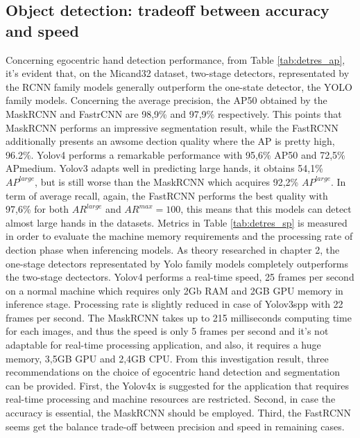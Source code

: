 \subsection{Object detection: tradeoff between accuracy and speed}
Concerning egocentric hand detection performance, from Table \ref{tab:detres_ap}, it’s evident that, on the Micand32 dataset, two-stage detectors, representated by the RCNN family models generally outperform the one-state detector, the YOLO family models. Concerning the average precision, the AP50 obtained by the MaskRCNN and FastrCNN are 98,9\% and 97,9\% respectively. This points that MaskRCNN performs an impressive segmentation result, while the FastRCNN additionally presents an awsome dection quality where the AP is pretty high, 96.2\%. Yolov4 performs a remarkable performance with 95,6\% AP50 and 72,5\% APmedium. Yolov3 adapts well in predicting large hands, it obtains 54,1\% \(AP^{large}\), but is still worse than the MaskRCNN which acquires 92,2\% \(AP^{large}\). In term of average recall, again, the FastRCNN performs the best quality with 97,6\% for both \(AR^{large}\) and \(AR^{max}=100\), this means that this models can detect almost large hands in the datasets.
Metrics in Table \ref{tab:detres_sp} is measured in order to evaluate the machine memory requirements and the processing rate of dection phase when inferencing models. As theory researched in chapter 2, the one-stage detectors representated by Yolo family models completely outperforms the two-stage dectectors. Yolov4 performs a real-time speed, 25 frames per second on a normal machine which requires only 2Gb RAM and 2GB GPU memory in inference stage. Processing rate is slightly reduced in case of Yolov3spp with 22 frames per second. The MaskRCNN takes up to 215 milliseconds computing time for each images, and thus the speed is only 5 frames per second and it’s not adaptable for real-time processing application, and also, it requires a huge memory, 3,5GB GPU and 2,4GB CPU.
From this investigation result, three recommendations on the choice of egocentric hand detection and segmentation can be provided. First, the Yolov4x is suggested for the application that requires real-time processing and machine resources are restricted. Second, in case the accuracy is essential, the MaskRCNN should be employed. Third, the FastRCNN seems get the balance trade-off between precision and speed in remaining cases.

